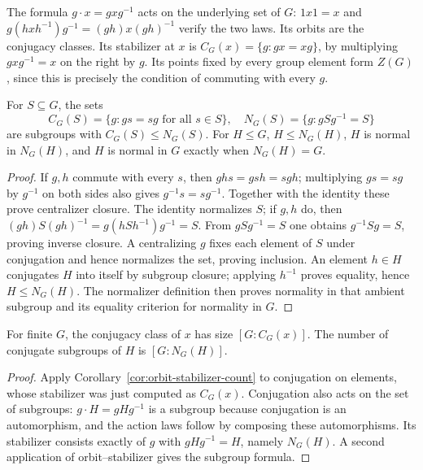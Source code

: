 The formula $g\cdot x=gxg^{-1}$ acts on the underlying set of $G$: $1x1=x$ and $g(hxh^{-1})g^{-1}=(gh)x(gh)^{-1}$ verify the two laws. Its orbits are the conjugacy classes. Its stabilizer at $x$ is
$C_G(x)=\{g:gx=xg\}$, by multiplying $gxg^{-1}=x$ on the right by $g$. Its points fixed by every group element form $Z(G)$, since this is precisely the condition of commuting with every $g$.

\begin{proposition}\label{prop:centralizers-normalizers}
For $S\subseteq G$, the sets
\[
 C_G(S)=\{g:gs=sg\text{ for all }s\in S\},\quad
 N_G(S)=\{g:gSg^{-1}=S\}
\]
are subgroups with $C_G(S)\leq N_G(S)$. For $H\leq G$, $H\leq N_G(H)$, $H$ is normal in $N_G(H)$, and $H$ is normal in $G$ exactly when $N_G(H)=G$.
\end{proposition}
\begin{proof}
If $g,h$ commute with every $s$, then $ghs=gsh=sgh$; multiplying $gs=sg$ by $g^{-1}$ on both sides also gives $g^{-1}s=sg^{-1}$. Together with the identity these prove centralizer closure. The identity normalizes $S$; if $g,h$ do, then $(gh)S(gh)^{-1}=g(hSh^{-1})g^{-1}=S$. From $gSg^{-1}=S$ one obtains $g^{-1}Sg=S$, proving inverse closure. A centralizing $g$ fixes each element of $S$ under conjugation and hence normalizes the set, proving inclusion. An element $h\in H$ conjugates $H$ into itself by subgroup closure; applying $h^{-1}$ proves equality, hence $H\leq N_G(H)$. The normalizer definition then proves normality in that ambient subgroup and its equality criterion for normality in $G$.
\end{proof}

\begin{proposition}\label{prop:conjugacy-count}
For finite $G$, the conjugacy class of $x$ has size $[G:C_G(x)]$. The number of conjugate subgroups of $H$ is $[G:N_G(H)]$.
\end{proposition}
\begin{proof}
Apply Corollary~\ref{cor:orbit-stabilizer-count} to conjugation on elements, whose stabilizer was just computed as $C_G(x)$. Conjugation also acts on the set of subgroups: $g\cdot H=gHg^{-1}$ is a subgroup because conjugation is an automorphism, and the action laws follow by composing these automorphisms. Its stabilizer consists exactly of $g$ with $gHg^{-1}=H$, namely $N_G(H)$. A second application of orbit--stabilizer gives the subgroup formula.
\end{proof}

